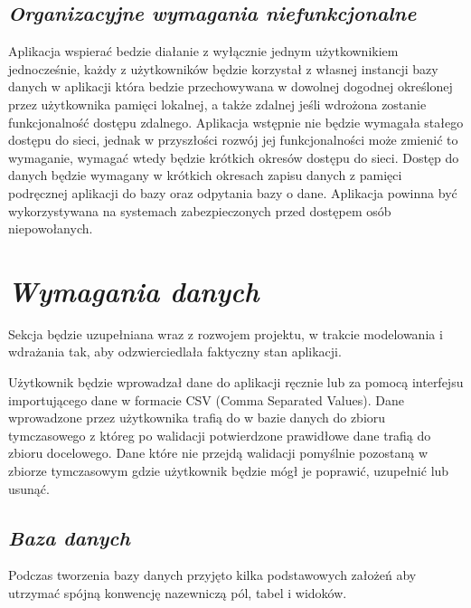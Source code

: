 \documentclass[a4paper,10pt]{report}
\newcommand{\customstylechapter}[1]{\large{\textit{#1}}}
\newcommand{\customstylesection}[1]{\textbf{\textit{#1}}}
\begin{document}
\section{\customstylesection{Organizacyjne wymagania niefunkcjonalne}}
{Aplikacja wspierać bedzie diałanie z wyłącznie jednym użytkownikiem 
jednocześnie, każdy z użytkowników będzie korzystał z własnej instancji bazy 
danych w aplikacji która bedzie przechowywana w dowolnej dogodnej określonej 
przez użytkownika pamięci lokalnej, a także zdalnej jeśli wdrożona zostanie 
funkcjonalność dostępu zdalnego. Aplikacja wstępnie nie będzie wymagała stałego 
dostępu do sieci, jednak w przyszłości rozwój jej funkcjonalności może zmienić 
to wymaganie, wymagać wtedy będzie krótkich okresów dostępu do sieci. Dostęp do 
danych będzie wymagany w krótkich okresach zapisu danych z pamięci podręcznej 
aplikacji do bazy oraz odpytania bazy o dane. Aplikacja powinna być 
wykorzystywana na systemach zabezpieczonych przed dostępem osób niepowołanych.}

\chapter{\customstylechapter{Wymagania danych}}
{Sekcja będzie uzupełniana wraz z rozwojem projektu, w trakcie modelowania i 
wdrażania tak, aby odzwierciedlała faktyczny stan aplikacji.}

{Użytkownik będzie wprowadzał dane do aplikacji ręcznie lub za pomocą interfejsu
importującego dane w formacie CSV (Comma Separated Values). Dane wprowadzone 
przez użytkownika trafią do w bazie danych do zbioru tymczasowego z któreg po 
walidacji potwierdzone prawidłowe dane trafią do zbioru docelowego. Dane które 
nie przejdą walidacji pomyślnie pozostaną w zbiorze tymczasowym gdzie użytkownik 
będzie mógł je poprawić, uzupełnić lub usunąć.}

\section{\customstylesection{Baza danych}}

{Podczas tworzenia bazy danych przyjęto kilka podstawowych założeń aby utrzymać 
spójną konwencję nazewniczą pól, tabel i widoków.}
\end{document}
